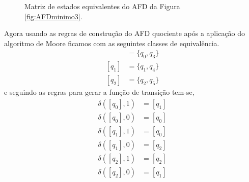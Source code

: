 \begin{exemplo}
\begin{figure}[H]
		\caption{Matriz de estados equivalentes do AFD da Figura \ref{fig:AFDminimo3}.}
		\label{tab:AutomatoMinimo4}
	\end{figure}

	Agora usando as regras de construção do AFD quociente após a aplicação do algoritmo de Moore ficamos com as seguintes classes de equivalência.
	\begin{align*}
    [q_0] & = \{q_0, q_3\}\\
    [q_1] & = \{q_1, q_4\}\\
    [q_2] & = \{q_2, q_5\}
	\end{align*}
	e seguindo as regras para gerar a função de transição tem-se,
	\begin{align*}
			\delta([q_0], 1) & = [q_1]\\
			\delta([q_0], 0) & = [q_0]\\
			\delta([q_1], 1) & = [q_0]\\
			\delta([q_1], 0) & = [q_2]\\
			\delta([q_2], 1) & = [q_2]\\
			\delta([q_2], 0) & = [q_1]
	\end{align*}


\end{exemplo}
